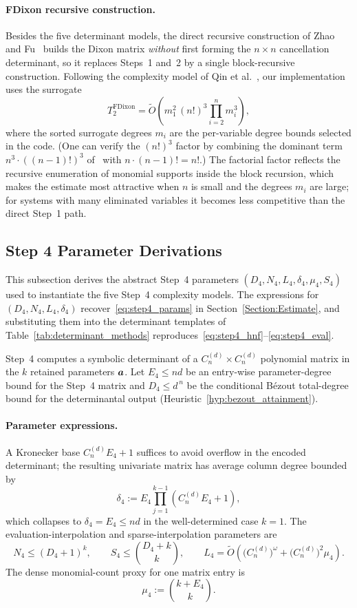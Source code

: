 \paragraph{FDixon recursive construction.}
Besides the five determinant models, the direct recursive construction of Zhao and Fu~\cite{Zhao2005extfast} builds the Dixon matrix \emph{without} first forming the $n\times n$ cancellation determinant, so it replaces Steps~1 and~2 by a single block-recursive construction. Following the complexity model of Qin et al.~\cite[Theorem~3.1]{DBLP:journals/ijcm/QinWTJ17}, our implementation uses the surrogate
\[
T_{2}^{\mathrm{FDixon}}=\widetilde{O}\!\left(m_1^2\,(n!)^3\prod_{i=2}^{n}m_i^3\right),
\]
where the sorted surrogate degrees $m_i$ are the per-variable degree bounds selected in the code. (One can verify the $(n!)^3$ factor by combining the dominant term $n^3\cdot ((n-1)!)^3$ of~\cite[Eq.~(19)--(20)]{DBLP:journals/ijcm/QinWTJ17} with $n\cdot(n-1)!=n!$.) The factorial factor reflects the recursive enumeration of monomial supports inside the block recursion, which makes the estimate most attractive when $n$ is small and the degrees $m_i$ are large; for systems with many eliminated variables it becomes less competitive than the direct Step~1 path.

\subsection{Step 4 Parameter Derivations}\label{appendix:step4}

This subsection derives the abstract Step~4 parameters $(D_4,N_4,L_4,\delta_4,\mu_4,S_4)$ used to instantiate the five Step~4 complexity models. The expressions for $(D_4,N_4,L_4,\delta_4)$ recover~\eqref{eq:step4_params} in Section~\ref{Section:Estimate}, and substituting them into the determinant templates of Table~\ref{tab:determinant_methods} reproduces~\eqref{eq:step4_hnf}--\eqref{eq:step4_eval}.

Step~4 computes a symbolic determinant of a $C_n^{(d)}\times C_n^{(d)}$ polynomial matrix in the $k$ retained parameters ${\boldsymbol{a}}$. Let $E_4\le nd$ be an entry-wise parameter-degree bound for the Step~4 matrix and $D_4\le d^{\,n}$ be the conditional B\'ezout total-degree bound for the determinantal output (Heuristic~\ref{hyp:bezout_attainment}).

\paragraph{Parameter expressions.}
A Kronecker base $C_n^{(d)}E_4+1$ suffices to avoid overflow in the encoded determinant; the resulting univariate matrix has average column degree bounded by
\[
\delta_4 := E_4 \prod_{j=1}^{k-1}(C_n^{(d)} E_4+1),
\]
which collapses to $\delta_4 = E_4 \le nd$ in the well-determined case $k=1$. The evaluation-interpolation and sparse-interpolation parameters are
\[
N_4 \le (D_4+1)^k,\qquad
S_4 \le \binom{D_4+k}{k},\qquad
L_4 = \widetilde{O}\!\left(\bigl(C_n^{(d)}\bigr)^\omega+\bigl(C_n^{(d)}\bigr)^2\mu_4\right).
\]
The dense monomial-count proxy for one matrix entry is
\[
\mu_4 := \binom{k+E_4}{k}.
\]

